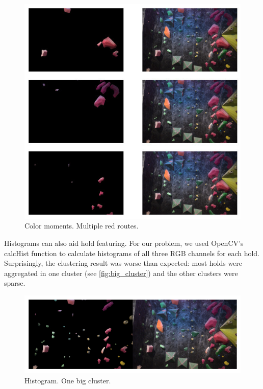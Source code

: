 \documentclass[final]{cvpr}
\begin{document}
\begin{figure}[h]
\centering
\includegraphics[width = \linewidth]{img/routes_std/several_clusters.jpg}
\caption{Color moments. Multiple red routes.}
\label{fig:several_clusters}
\end{figure}

Histograms can also aid hold featuring. For our problem, we used OpenCV's calcHist function to calculate histograms of all three RGB channels for each hold. Surprisingly, the clustering result was worse than expected: most holds were aggregated in one cluster (see \autoref{fig:big_cluster}) and the other clusters were sparse.

\begin{figure}[h]
\centering
\includegraphics[width = \linewidth]{img/routes_std/big_cluster.jpg}
\caption{Histogram. One big cluster.}
\label{fig:big_cluster}
\end{figure}
\end{document}
